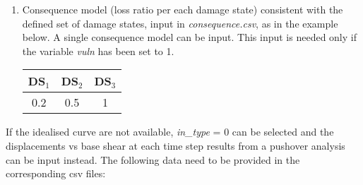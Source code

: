\begin{enumerate}
\item Consequence model (loss ratio per each damage state) consistent with the defined set of damage states, input in \textit{consequence.csv}, as in the example below. A single consequence model can be input. This input is needed only if the variable \textit{vuln} has been set to 1.	
	\begin{table}[!htbp]
	\centering
	\begin{tabular}{|c|c|c|} \hline
	\textbf{DS$_1$} & \textbf{DS$_2$} & \textbf{DS$_3$} \\ \hline
	0.2	& 0.5	 & 1\\ \hline
	\end{tabular}
	\end{table}
	
\end{enumerate}

If the idealised curve are not available, \textit{in\_type} = 0 can be selected and the displacements vs base shear at each time step results from a pushover analysis can be input instead. The following data need to be provided in the corresponding csv files:

